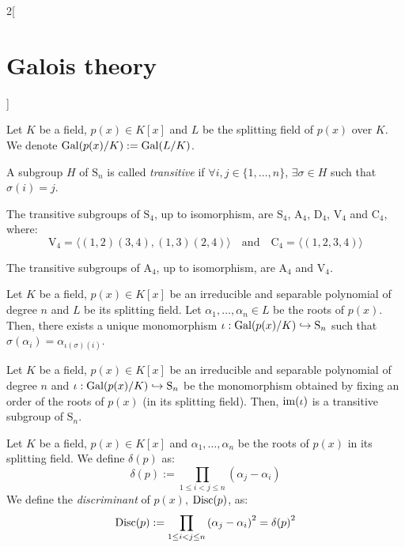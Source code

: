 \documentclass[../../../main.tex]{subfiles}
\begin{document}
\begin{multicols}{2}[\section{Galois theory}]
\begin{center}
\begin{minipage}{\linewidth}
    \end{minipage}
  \end{center}
  \begin{definition}
    Let $K$ be a field, $p(x)\in K[x]$ and $L$ be the splitting field of $p(x)$ over $K$. We denote $\operatorname{Gal}(p(x)/K):=\operatorname{Gal}(L/K)$.
  \end{definition}
  \begin{definition}
    A subgroup $H$ of $\text{S}_n$ is called \emph{transitive} if $\forall i,j\in\{1,\ldots,n\}$, $\exists \sigma\in H$ such that $\sigma(i)=j$.
  \end{definition}
  \begin{lemma}
    The transitive subgroups of $\text{S}_4$, up to isomorphism, are $\text{S}_4$, $\text{A}_4$, $\text{D}_4$, $\text{V}_4$ and $\text{C}_4$, where:
    $$\text{V}_4=\langle (1,2)(3,4),(1,3)(2,4)\rangle\quad\text{and}\quad \text{C}_4=\langle(1,2,3,4)\rangle$$
  \end{lemma}
  \begin{corollary}
    The transitive subgroups of $\text{A}_4$, up to isomorphism, are $\text{A}_4$ and $\text{V}_4$.
  \end{corollary}
  \begin{lemma}
    Let $K$ be a field, $p(x)\in K[x]$ be an irreducible and separable polynomial of degree $n$ and $L$ be its splitting field. Let $\alpha_1,\ldots,\alpha_n\in L$ be the roots of $p(x)$. Then, there exists a unique monomorphism $\iota: \operatorname{Gal}(p(x)/K)\hookrightarrow \text{S}_n$ such that $\sigma(\alpha_i)=\alpha_{\iota(\sigma)(i)}$.
  \end{lemma}
  \begin{lemma}
    Let $K$ be a field, $p(x)\in K[x]$ be an irreducible and separable polynomial of degree $n$ and $\iota: \operatorname{Gal}(p(x)/K)\hookrightarrow \text{S}_n$ be the monomorphism obtained by fixing an order of the roots of $p(x)$ (in its splitting field). Then, $\operatorname{im}(\iota)$ is a transitive subgroup of $\text{S}_n$.
  \end{lemma}
  \begin{definition}
    Let $K$ be a field, $p(x)\in K[x]$ and $\alpha_1,\ldots,\alpha_n$ be the roots of $p(x)$ in its splitting field. We define $\delta(p)$ as: $$\delta(p):=\prod_{1\leq i<j\leq n}(\alpha_j-\alpha_i)$$
    We define the \emph{discriminant} of $p(x)$, $\operatorname{Disc}(p)$, as: $$\operatorname{Disc}(p):=\prod_{1\leq i<j\leq n}{(\alpha_j-\alpha_i)}^2={\delta(p)}^2$$
  \end{definition}

\end{multicols}
\end{document}
